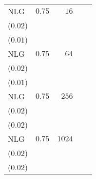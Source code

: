 \begin{table*}[t]
\begin{tabular}{lrrrr}
NLG & \(0.75\) & \(16\) & \longcell{\(0.09\)\\{\tiny(\(0.02\))}} & \longcell{\(0.03\)\\{\tiny(\(0.01\))}} \\[2.2ex]
NLG & \(0.75\) & \(64\) & \longcell{\(0.17\)\\{\tiny(\(0.02\))}} & \longcell{\(0.07\)\\{\tiny(\(0.01\))}} \\[2.2ex]
NLG & \(0.75\) & \(256\) & \longcell{\(0.25\)\\{\tiny(\(0.02\))}} & \longcell{\(0.12\)\\{\tiny(\(0.02\))}} \\[2.2ex]
NLG & \(0.75\) & \(1024\) & \longcell{\(0.33\)\\{\tiny(\(0.02\))}} & \longcell{\(0.19\)\\{\tiny(\(0.02\))}} \\[2.2ex]

\end{tabular}
\end{table*}
